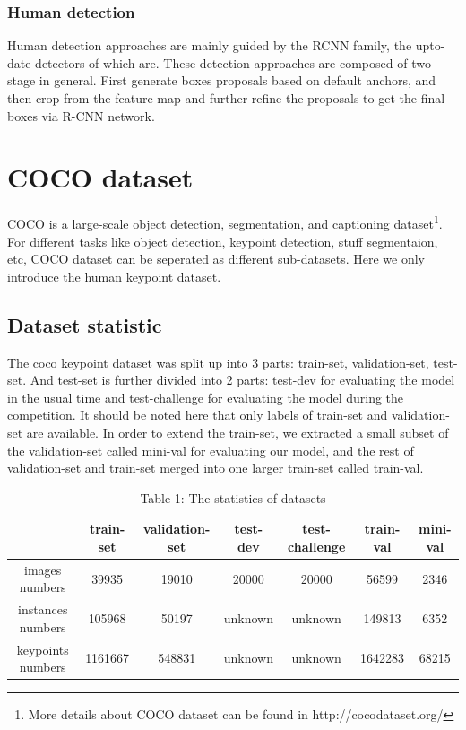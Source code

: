 \subsubsection{Human detection}
Human detection approaches are mainly guided by the RCNN family\cite{girshick2014rich, girshick2015fast, ren2015faster}, the upto-date detectors of which are\cite{lin2017feature, he2017mask}.
These detection approaches are composed of two-stage in general.
First generate boxes proposals based on default anchors, and then crop from the feature map and further refine the proposals to get the final boxes via R-CNN network.


\section{COCO dataset}

COCO\cite{lin2014microsoft} is a large-scale object detection, segmentation, and captioning dataset\footnote{More details about COCO dataset can be found in http://cocodataset.org/}.
For different tasks like object detection, keypoint detection, stuff segmentaion, etc, COCO dataset can be seperated as different sub-datasets.
Here we only introduce the human keypoint dataset.


\subsection{Dataset statistic}
The coco keypoint dataset was split up into 3 parts: train-set, validation-set, test-set.
And test-set is further divided into 2 parts: test-dev for evaluating the model in the usual time and test-challenge for evaluating the model during the competition.
It should be noted here that only labels of train-set and validation-set are available.
In order to extend the train-set, we extracted a small subset of the validation-set called mini-val for evaluating our model,
and the rest of validation-set and train-set merged into one larger train-set called train-val.

\captionsetup[table]{labelformat=empty}
\begin{table}[!hbp]
  \centering
  \begin{tabular}{|c|c|c|c|c|c|c|}
  \hline
            & train-set & validation-set & test-dev & test-challenge & train-val & mini-val \\
  \hline
  images numbers & 39935 & 19010 & 20000 & 20000 & 56599 & 2346\\
  \hline
  instances numbers & 105968 & 50197 & unknown & unknown & 149813 & 6352\\
  \hline
  keypoints numbers & 1161667  & 548831 & unknown & unknown & 1642283 & 68215\\
  \hline
  \end{tabular}
  \caption{Table 1: The statistics of datasets}
\end{table}

